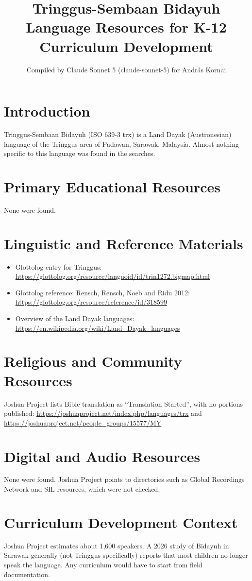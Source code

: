\documentclass[12pt]{article}
\title{Tringgus-Sembaan Bidayuh Language Resources for K-12 Curriculum Development}
\author{Compiled by Claude Sonnet 5 (claude-sonnet-5) for Andr\'as Kornai}
\date{}
\begin{document}
\maketitle
\section{Introduction}
Tringgus-Sembaan Bidayuh (ISO 639-3 trx) is a Land Dayak (Austronesian) language of the Tringgus area of Padawan, Sarawak, Malaysia. Almost nothing specific to this language was found in the searches.
\section{Primary Educational Resources}
None were found.
\section{Linguistic and Reference Materials}
\begin{itemize}
\item Glottolog entry for Tringgus: \url{https://glottolog.org/resource/languoid/id/trin1272.bigmap.html}
\item Glottolog reference: Rensch, Rensch, Noeb and Ridu 2012: \url{https://glottolog.org/resource/reference/id/318599}
\item Overview of the Land Dayak languages: \url{https://en.wikipedia.org/wiki/Land_Dayak_languages}
\end{itemize}
\section{Religious and Community Resources}
Joshua Project lists Bible translation as ``Translation Started'', with no portions published: \url{https://joshuaproject.net/index.php/languages/trx} and \url{https://joshuaproject.net/people_groups/15577/MY}
\section{Digital and Audio Resources}
None were found. Joshua Project points to directories such as Global Recordings Network and SIL resources, which were not checked.
\section{Curriculum Development Context}
Joshua Project estimates about 1,600 speakers. A 2026 study of Bidayuh in Sarawak generally (not Tringgus specifically) reports that most children no longer speak the language. Any curriculum would have to start from field documentation.
\end{document}

